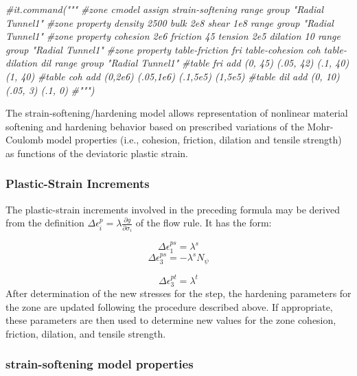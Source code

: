 \documentclass[a4paper, nobind]{templates/ociamthesis}
\newenvironment{Shaded}{\begin{snugshade}}{\end{snugshade}}
\newcommand{\CommentTok}[1]{\textcolor[rgb]{0.56,0.35,0.01}{\textit{#1}}}
\renewenvironment{Shaded}
{
  \vspace{10pt}%
  \begin{snugshade}%
}{%
  \end{snugshade}%
  \vspace{8pt}%
}
\begin{document}
\begin{Shaded}
\begin{Highlighting}[]
\CommentTok{\#it.command("""}
\CommentTok{\#zone cmodel assign strain{-}softening range group "Radial Tunnel1"}
\CommentTok{\#zone property density 2500 bulk 2e8 shear 1e8 range group "Radial Tunnel1"}
\CommentTok{\#zone property cohesion 2e6 friction 45 tension 2e5 dilation 10 range group "Radial Tunnel1"}
\CommentTok{\#zone property table{-}friction \textquotesingle{}fri\textquotesingle{} table{-}cohesion \textquotesingle{}coh\textquotesingle{} table{-}dilation \textquotesingle{}dil\textquotesingle{} range group "Radial Tunnel1"}
\CommentTok{\#table \textquotesingle{}fri\textquotesingle{} add (0, 45) (.05, 42) (.1, 40) (1, 40)}
\CommentTok{\#table \textquotesingle{}coh\textquotesingle{} add (0,2e6) (.05,1e6) (.1,5e5) (1,5e5)}
\CommentTok{\#table \textquotesingle{}dil\textquotesingle{} add (0, 10) (.05,  3) (.1,  0)}
\CommentTok{\#""")}
\end{Highlighting}
\end{Shaded}

The strain-softening/hardening model allows representation of nonlinear material softening and hardening behavior based on prescribed variations of the Mohr-Coulomb model properties (i.e., cohesion, friction, dilation and tensile strength) as functions of the deviatoric plastic strain.

\hypertarget{plastic-strain-increments}{%
\subsubsection{Plastic-Strain Increments}\label{plastic-strain-increments}}

The plastic-strain increments involved in the preceding formula may be derived from the definition \(\Delta \epsilon_{i}^{p} = \lambda \frac{\partial g}{\partial \sigma_{i}}\) of the flow rule. It has the form:

\[ \Delta \epsilon_{1}^{ps} = \lambda^{s}\]
\[ \Delta \epsilon_{3}^{ps} = - \lambda^{s} N_{\psi}\]

\[ \Delta \epsilon_{3}^{pt} = \lambda^{t}\]
After determination of the new stresses for the step, the hardening parameters for the zone are updated following the procedure described above. If appropriate, these parameters are then used to determine new values for the zone cohesion, friction, dilation, and tensile strength.

\hypertarget{strain-softening-model-properties}{%
\subsubsection{strain-softening model properties}\label{strain-softening-model-properties}}
\end{document}
